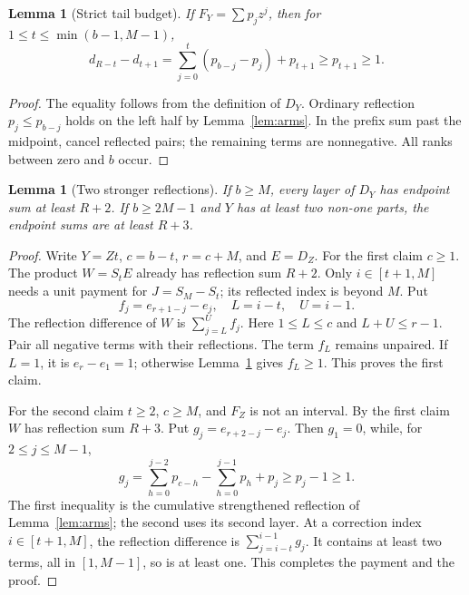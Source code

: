 \documentclass[11pt]{article}
\newtheorem{lemma}[theorem]{Lemma}
\theoremstyle{remark}\newtheorem{remark}[theorem]{Remark}
\begin{document}
\begin{lemma}[Strict tail budget]\label{lem:budget}
If $F_Y=\sum p_jz^j$, then for $1\le t\le\min(b-1,M-1)$,
\begin{equation}\label{eq:budget}
 d_{R-t}-d_{t+1}=\sum_{j=0}^t(p_{b-j}-p_j)+p_{t+1}\ge p_{t+1}\ge1.
\end{equation}
\end{lemma}
\begin{proof}
The equality follows from the definition of $D_Y$. Ordinary reflection $p_j\le p_{b-j}$ holds on the left half by Lemma~\ref{lem:arms}. In the prefix sum past the midpoint, cancel reflected pairs; the remaining terms are nonnegative. All ranks between zero and $b$ occur.
\end{proof}

\begin{lemma}[Two stronger reflections]\label{lem:strongkernel}
If $b\ge M$, every layer of $D_Y$ has endpoint sum at least $R+2$. If $b\ge2M-1$ and $Y$ has at least two non-one parts, the endpoint sums are at least $R+3$.
\end{lemma}
\begin{proof}
Write $Y=Zt$, $c=b-t$, $r=c+M$, and $E=D_Z$. For the first claim $c\ge1$. The product $W=S_tE$ already has reflection sum $R+2$. Only $i\in[t+1,M]$ needs a unit payment for $J=S_M-S_t$; its reflected index is beyond $M$. Put
\[
 f_j=e_{r+1-j}-e_j,\quad L=i-t,\quad U=i-1.
\]
The reflection difference of $W$ is $\sum_{j=L}^Uf_j$. Here $1\le L\le c$ and $L+U\le r-1$. Pair all negative terms with their reflections. The term $f_L$ remains unpaired. If $L=1$, it is $e_r-e_1=1$; otherwise Lemma~\ref{lem:budget} gives $f_L\ge1$. This proves the first claim.

For the second claim $t\ge2$, $c\ge M$, and $F_Z$ is not an interval. By the first claim $W$ has reflection sum $R+3$. Put $g_j=e_{r+2-j}-e_j$. Then $g_1=0$, while, for $2\le j\le M-1$,
\[
 g_j=\sum_{h=0}^{j-2}p_{c-h}-\sum_{h=0}^{j-1}p_h+p_j
 \ge p_j-1\ge1.
\]
The first inequality is the cumulative strengthened reflection of Lemma~\ref{lem:arms}; the second uses its second layer. At a correction index $i\in[t+1,M]$, the reflection difference is $\sum_{j=i-t}^{i-1}g_j$. It contains at least two terms, all in $[1,M-1]$, so is at least one. This completes the payment and the proof.
\end{proof}














\end{document}
